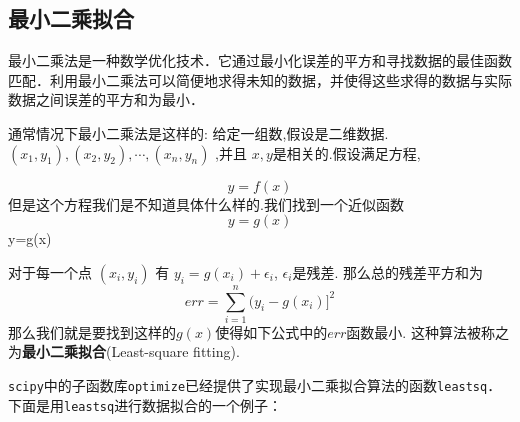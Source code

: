 
\subsection{最小二乘拟合}
最小二乘法是一种数学优化技术．它通过最小化误差的平方和寻找数据的最佳函数匹配．利用最小二乘法可以简便地求得未知的数据，并使得这些求得的数据与实际数据之间误差的平方和为最小．

通常情况下最小二乘法是这样的:
给定一组数,假设是二维数据.$(x_1,y_1),(x_2,y_2),\cdots,(x_n,y_n)$ ,并且 $x,y$是相关的.假设满足方程,

\begin{equation}
y=f(x)
\end{equation}
但是这个方程我们是不知道具体什么样的.我们找到一个近似函数
\begin{equation}
y=g(x)
\end{equation}
y=g(x)

对于每一个点 $(x_i,y_i)$ 有 $y_i=g(x_i)+\epsilon_i$, $\epsilon_i$是残差. 那么总的残差平方和为
\begin{equation}
err=\sum_{i=1}^n(y_i-g(x_i)]^2
\end{equation}
那么我们就是要找到这样的$g(x)$使得如下公式中的$err$函数最小. 这种算法被称之为\textbf{最小二乘拟合}(Least-square fitting).

\verb|scipy|中的子函数库\verb|optimize|已经提供了实现最小二乘拟合算法的函数\verb|leastsq|．下面是用\verb|leastsq|进行数据拟合的一个例子：